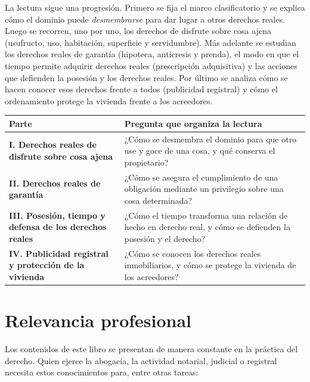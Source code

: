 \documentclass[12pt,oneside]{book}
\begin{document}
La lectura sigue una progresión. Primero se fija el marco clasificatorio y se explica cómo el dominio puede \textit{desmembrarse} para dar lugar a otros derechos reales. Luego se recorren, uno por uno, los derechos de disfrute sobre cosa ajena (usufructo, uso, habitación, superficie y servidumbre). Más adelante se estudian los derechos reales de garantía (hipoteca, anticresis y prenda), el modo en que el tiempo permite adquirir derechos reales (prescripción adquisitiva) y las acciones que defienden la posesión y los derechos reales. Por último se analiza cómo se hacen conocer esos derechos frente a todos (publicidad registral) y cómo el ordenamiento protege la vivienda frente a los acreedores.

\begin{center}
\begin{tabularx}{\textwidth}{@{}>{\raggedright\arraybackslash}p{}>{\raggedright\arraybackslash}X@{}}
\toprule
\textbf{Parte} & \textbf{Pregunta que organiza la lectura} \\
\midrule
\textbf{I. Derechos reales de disfrute sobre cosa ajena} & ¿Cómo se desmembra el dominio para que otro use y goce de una cosa, y qué conserva el propietario? \\
\textbf{II. Derechos reales de garantía} & ¿Cómo se asegura el cumplimiento de una obligación mediante un privilegio sobre una cosa determinada? \\
\textbf{III. Posesión, tiempo y defensa de los derechos reales} & ¿Cómo el tiempo transforma una relación de hecho en derecho real, y cómo se defienden la posesión y el derecho? \\
\textbf{IV. Publicidad registral y protección de la vivienda} & ¿Cómo se conocen los derechos reales inmobiliarios, y cómo se protege la vivienda de los acreedores? \\
\bottomrule
\end{tabularx}
\end{center}

\section*{Relevancia profesional}

Los contenidos de este libro se presentan de manera constante en la práctica del derecho. Quien ejerce la abogacía, la actividad notarial, judicial o registral necesita estos conocimientos para, entre otras tareas:
\end{document}
